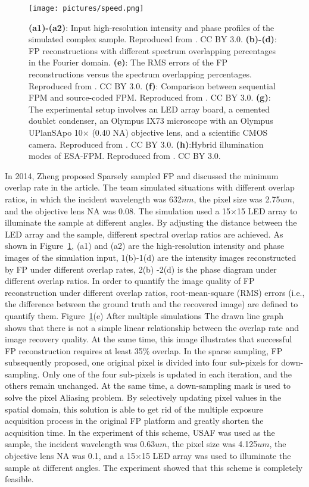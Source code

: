 \documentclass[journal,review,submit,pdftex,moreauthors]{Definitions/mdpi}
\begin{document}
\begin{figure}[H]
    \centering
    \texttt{[image: pictures/speed.png]}
    \caption{\textbf{(a1)-(a2)}: Input high-resolution intensity and phase profiles of the simulated complex sample. Reproduced from \cite{dong2014sparsely}. CC BY 3.0. \textbf{(b)-(d)}: FP reconstructions with different spectrum overlapping percentages in the Fourier domain. \textbf{(e)}: The RMS errors of the FP reconstructions versus the spectrum overlapping percentages. Reproduced from \cite{dong2014sparsely}. CC BY 3.0. \textbf{(f)}: Comparison between sequential FPM and source-coded FPM. Reproduced from \cite{dong2014sparsely}. CC BY 3.0. \textbf{(g)}: The experimental setup involves an LED array board, a cemented doublet condenser, an Olympus IX73 microscope with an Olympus UPlanSApo 10× (0.40 NA) objective lens, and a scientific CMOS camera. Reproduced from \cite{sun2018high}. CC BY 3.0. \textbf{(h)}:Hybrid illumination modes of ESA-FPM. Reproduced from \cite{fan2023efficient}. CC BY 3.0. }
    \label{fig:enter-label}
\end{figure}

In 2014, Zheng proposed Sparsely sampled FP and discussed the minimum overlap rate in the article. The team simulated situations with different overlap ratios, in which the incident wavelength was 632$nm$, the pixel size was 2.75$um$, and the objective lens NA was 0.08. The simulation used a 15×15 LED array to illuminate the sample at different angles. By adjusting the distance between the LED array and the sample, different spectral overlap ratios are achieved\cite{dong2014sparsely}. As shown in Figure~\ref{fig:enter-label}, (a1) and (a2) are the high-resolution intensity and phase images of the simulation input, 1(b)-1(d) are the intensity images reconstructed by FP under different overlap rates, 2(b) -2(d) is the phase diagram under different overlap ratios. In order to quantify the image quality of FP reconstruction under different overlap ratios, root-mean-square (RMS) errors (i.e., the difference between the ground truth and the recovered image) are defined to quantify them. Figure~\ref{fig:enter-label}(e) After multiple simulations The drawn line graph shows that there is not a simple linear relationship between the overlap rate and image recovery quality. At the same time, this image illustrates that successful FP reconstruction requires at least 35\% overlap. In the sparse sampling, FP subsequently proposed, one original pixel is divided into four sub-pixels for down-sampling. Only one of the four sub-pixels is updated in each iteration, and the others remain unchanged. At the same time, a down-sampling mask is used to solve the pixel Aliasing problem. By selectively updating pixel values in the spatial domain, this solution is able to get rid of the multiple exposure acquisition process in the original FP platform and greatly shorten the acquisition time. In the experiment of this scheme, USAF was used as the sample, the incident wavelength was 0.63$um$, the pixel size was 4.125$um$, the objective lens NA was 0.1, and a 15×15 LED array was used to illuminate the sample at different angles. The experiment showed that this scheme is completely feasible.
\end{document}
